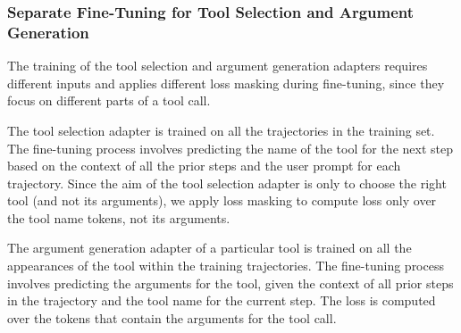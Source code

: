 \subsubsection{Separate Fine-Tuning for Tool Selection and Argument Generation}

The training of the tool selection and argument generation adapters requires different inputs and applies different loss masking during fine-tuning, since they focus on different parts of a tool call. 

The tool selection adapter is trained on all the trajectories in the training set. The fine-tuning process involves predicting the name of the tool for the next step based on the context of all the prior steps and the user prompt for each trajectory. Since the aim of the tool selection adapter is only to choose the right tool (and not its arguments), we apply loss masking to compute loss only over the tool name tokens, not its arguments. 

The argument generation adapter of a particular tool is trained on all the appearances of the tool within the training trajectories. The fine-tuning process involves predicting the arguments for the tool, given the context of all prior steps in the trajectory and the tool name for the current step. The loss is computed over the tokens that contain the arguments for the tool call. 




